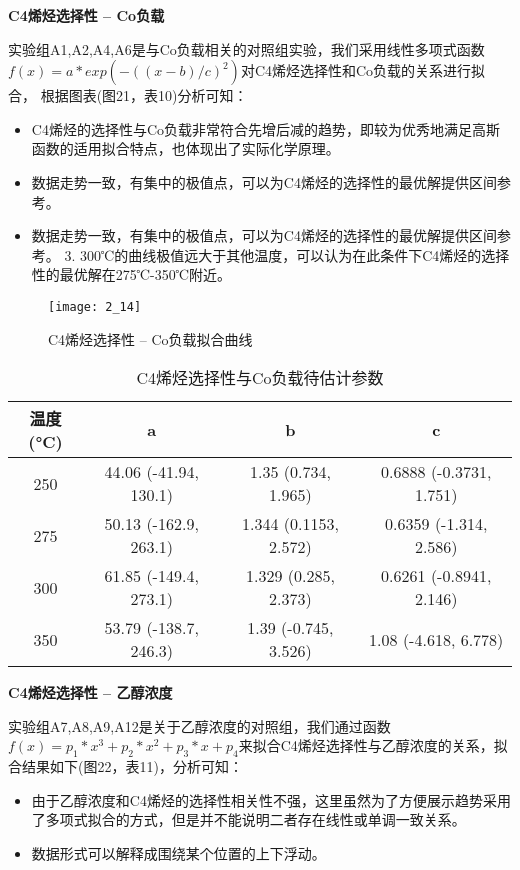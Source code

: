 \documentclass[withoutpreface,bwprint]{cumcmthesis} %
\begin{document}
\textbf{C4烯烃选择性 -- Co负载}

实验组A1,A2,A4,A6是与Co负载相关的对照组实验，我们采用线性多项式函数 $f(x) =  a*exp(-((x-b)/c)^2)$对C4烯烃选择性和Co负载的关系进行拟合，
根据图表(图21，表10)分析可知：
\begin{itemize}
	\item C4烯烃的选择性与Co负载非常符合先增后减的趋势，即较为优秀地满足高斯函数的适用拟合特点，也体现出了实际化学原理。
	\item 数据走势一致，有集中的极值点，可以为C4烯烃的选择性的最优解提供区间参考。
	\item 数据走势一致，有集中的极值点，可以为C4烯烃的选择性的最优解提供区间参考。
	3. 300℃的曲线极值远大于其他温度，可以认为在此条件下C4烯烃的选择性的最优解在275℃-350℃附近。
\end{itemize}

\begin{figure}[!h]
	\centering
	\texttt{[image: 2\_14]}
	\caption{C4烯烃选择性 -- Co负载拟合曲线}
	\label{fig:circuit-diagram1}
\end{figure}

\begin{table}[!htbp]
	\caption{C4烯烃选择性与Co负载待估计参数}\label{tab:001} \centering
	\begin{tabular}{cccc}
		\toprule[1.5pt]
		温度(°C) & a & b & c \\
		\midrule[1pt]
		250 & 44.06  (-41.94, 130.1) &  1.35  (0.734, 1.965) &  0.6888  (-0.3731, 1.751) \\
		275 & 50.13  (-162.9, 263.1) &   1.344  (0.1153, 2.572)& 0.6359  (-1.314, 2.586) \\
		300 & 61.85  (-149.4, 273.1) & 1.329  (0.285, 2.373)& 0.6261  (-0.8941, 2.146) \\
		350 &53.79  (-138.7, 246.3) &  1.39  (-0.745, 3.526)& 1.08  (-4.618, 6.778)  \\
		\bottomrule[1.5pt]
	\end{tabular}
\end{table}




\newpage
\textbf{C4烯烃选择性 -- 乙醇浓度}

实验组A7,A8,A9,A12是关于乙醇浓度的对照组，我们通过函数$ f(x) = p_1*x^3 + p_2*x^2 + p_3*x + p_4$来拟合C4烯烃选择性与乙醇浓度的关系，拟合结果如下(图22，表11)，分析可知：
\begin{itemize}
	\item 由于乙醇浓度和C4烯烃的选择性相关性不强，这里虽然为了方便展示趋势采用了多项式拟合的方式，但是并不能说明二者存在线性或单调一致关系。
	\item 数据形式可以解释成围绕某个位置的上下浮动。
\end{itemize}
\end{document}
